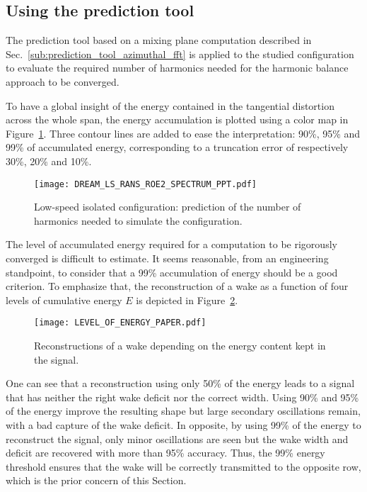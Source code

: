 
\subsection{Using the prediction tool}
\label{sub:dream_ls_conv_hb_prediction_tool}

The prediction tool based on a mixing plane computation 
described in 
Sec.~\ref{sub:prediction_tool_azimuthal_fft} is applied
to the studied configuration to evaluate the
required number of harmonics needed for the
harmonic balance approach to be converged.

To have a global insight of the energy contained in the
tangential distortion across the whole span,
the energy accumulation is plotted using a color map
in Figure~\ref{fig:DREAM_LS_RANS_ROE2_SPECTRUM_PPT}.
Three contour lines are added to ease the
interpretation: 90\%, 95\%
and 99\% of accumulated energy, corresponding to a truncation
error of respectively 30\%, 20\% and 10\%.
\begin{figure}[htp]
  \centering
  \texttt{[image: DREAM\_LS\_RANS\_ROE2\_SPECTRUM\_PPT.pdf]}
  \caption{Low-speed isolated configuration: prediction of the number
  of harmonics needed to simulate the configuration.}
  \label{fig:DREAM_LS_RANS_ROE2_SPECTRUM_PPT}
\end{figure}

The level of accumulated energy required 
for a computation to be rigorously converged
is difficult to estimate. 
It seems reasonable, from an engineering standpoint, to consider
that a 99\% accumulation of energy should be a good criterion.
To emphasize that,
the reconstruction of a wake as a function of four levels of cumulative
energy $E$ is depicted in Figure~\ref{fig:level_of_energy}. 
\begin{figure}[htp]
  \centering
  \texttt{[image: LEVEL\_OF\_ENERGY\_PAPER.pdf]}
  \caption{Reconstructions of a wake depending on
  the energy content kept in the signal.}
  \label{fig:level_of_energy}
\end{figure}
One can see
that a reconstruction using only 50\% of the energy
leads to a signal that has neither
the right wake deficit nor the correct width. Using
90\% and 95\% of the energy improve the resulting shape
but  large secondary
oscillations remain, with a bad capture
of the wake deficit.
In opposite, by using 99\% of the energy to reconstruct
the signal, only minor
oscillations are seen but 
the wake width and deficit are recovered with more than 
95\% accuracy.
Thus, the 99\% energy threshold ensures that the wake
will be correctly transmitted to the opposite row, which is
the prior concern of this Section.

